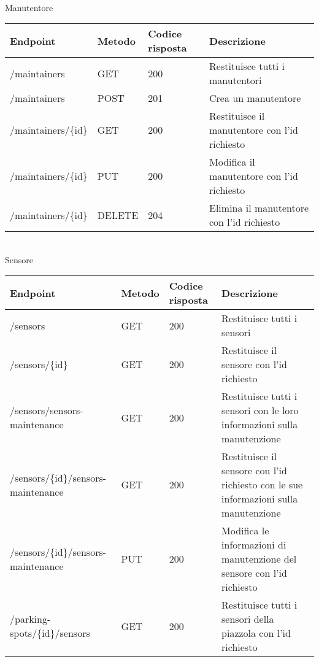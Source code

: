 \leavevmode\newline
\\
Manutentore
\\
\begin{table}
    \begin{tabular}{|p{3.2cm}|p{1.4cm}|p{1.4cm}|p{5.8cm}|} 
    \hline
    \textbf{Endpoint} & \textbf{Metodo} & \textbf{Codice risposta} & \textbf{Descrizione} \\ 
    \hline
    /maintainers & GET & 200 & Restituisce tutti i manutentori \\ 
    \hline
    /maintainers & POST & 201 & Crea un manutentore \\ 
    \hline
    /maintainers/\{id\} & GET & 200 & Restituisce il manutentore con l'id richiesto \\ 
    \hline
    /maintainers/\{id\} & PUT & 200 & Modifica il manutentore con l'id richiesto \\ 
    \hline
    /maintainers/\{id\} & DELETE & 204 & Elimina il manutentore con l'id richiesto \\ 
    \hline
    \end{tabular}
\end{table}
\leavevmode\newline
\\
Sensore
\\
\begin{table}
    \begin{tabular}{|p{3.2cm}|p{1.4cm}|p{1.4cm}|p{5.8cm}|} 
    \hline
    \textbf{Endpoint} & \textbf{Metodo} & \textbf{Codice risposta} & \textbf{Descrizione} \\ 
    \hline
    /sensors & GET & 200 & Restituisce tutti i sensori \\ 
    \hline
    /sensors/\{id\} & GET & 200 & Restituisce il sensore con l'id richiesto \\ 
    \hline
    /sensors/sensors-maintenance & GET & 200 & Restituisce tutti i sensori con le loro informazioni sulla 
        manutenzione \\ 
    \hline
    /sensors/\{id\}/sensors-maintenance & GET & 200 & Restituisce il sensore con l'id richiesto con le sue 
        informazioni sulla manutenzione \\ 
    \hline
    /sensors/\{id\}/sensors-maintenance & PUT & 200 & Modifica le informazioni di manutenzione del sensore con
        l'id richiesto \\ 
    \hline
    /parking-spots/\{id\}/sensors & GET & 200 & Restituisce tutti i sensori della piazzola con l'id richiesto \\ 
    \hline
    \end{tabular}
\end{table}
